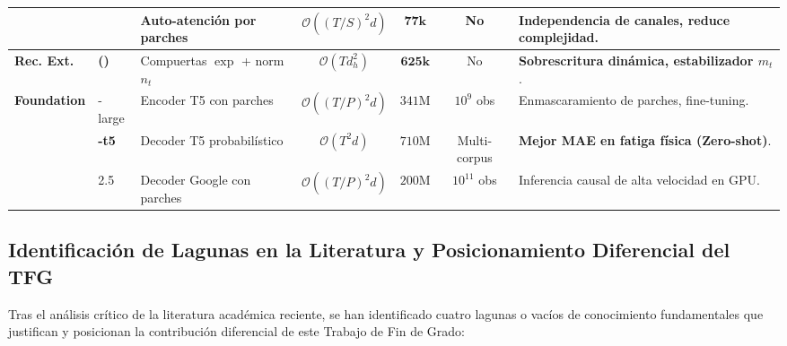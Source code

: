 \begin{table}[htbp]
{\begin{tabular}{@{}llp{3.8cm}cccp{5.5cm}@{}}
& \patchtst{} & Auto-atención por parches & $\mathcal{O}((T/S)^2 d)$ & $\mathbf{77\text{k}}$ & No & Independencia de canales, reduce complejidad. \\
\midrule
\textbf{Rec. Ext.} 
& \textbf{\xlstm{} (\slstm{})} & Compuertas $\exp$ + norm $n_t$ & $\mathcal{O}(T d_h^2)$ & $\mathbf{625\text{k}}$ & No & \textbf{Sobrescritura dinámica, estabilizador $m_t$}. \\
\midrule
\multirow{3}{*}{\textbf{Foundation}} 
& \moment{}-large & Encoder T5 con parches & $\mathcal{O}((T/P)^2 d)$ & $341\text{M}$ & $10^9$ obs & Enmascaramiento de parches, fine-tuning. \\
& \textbf{\chronos{}-t5} & Decoder T5 probabilístico & $\mathcal{O}(T^2 d)$ & $710\text{M}$ & Multi-corpus & \textbf{Mejor MAE en fatiga física (Zero-shot)}. \\
& \timesfm{} 2.5 & Decoder Google con parches & $\mathcal{O}((T/P)^2 d)$ & $200\text{M}$ & $10^{11}$ obs & Inferencia causal de alta velocidad en GPU. \\
\bottomrule
\end{tabular}%
}
\end{table}

\subsection{Identificación de Lagunas en la Literatura y Posicionamiento Diferencial del TFG}
\label{sec:teoria_lagunas}

Tras el análisis crítico de la literatura académica reciente, se han identificado cuatro lagunas o vacíos de conocimiento fundamentales que justifican y posicionan la contribución diferencial de este Trabajo de Fin de Grado:

